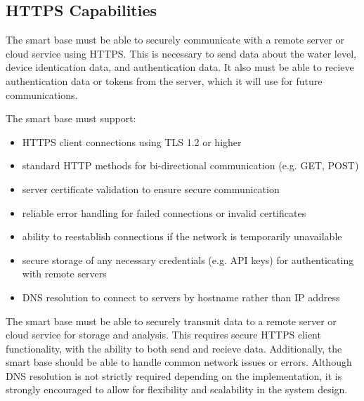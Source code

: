 \subsection{HTTPS Capabilities}
The smart base must be able to securely communicate with a remote server or cloud service using HTTPS. This is necessary to send data about the water level, device identication data, and authentication data. It also must be able to recieve authentication data or tokens from the server, which it will use for future communications.

The smart base must support:
\begin{itemize}
    \item HTTPS client connections using TLS 1.2 or higher
    \item standard HTTP methods for bi-directional communication (e.g. GET, POST)
    \item server certificate validation to ensure secure communication
    \item reliable error handling for failed connections or invalid certificates
    \item ability to reestablish connections if the network is temporarily unavailable
    \item secure storage of any necessary credentials (e.g. API keys) for authenticating with remote servers
    \item DNS resolution to connect to servers by hostname rather than IP address
\end{itemize}

The smart base must be able to securely transmit data to a remote server or cloud service for storage and analysis. This requires secure HTTPS client functionality, with the ability to both send and recieve data. Additionally, the smart base should be able to handle common network issues or errors. Although DNS resolution is not strictly required depending on the implementation, it is strongly encouraged to allow for flexibility and scalability in the system design.